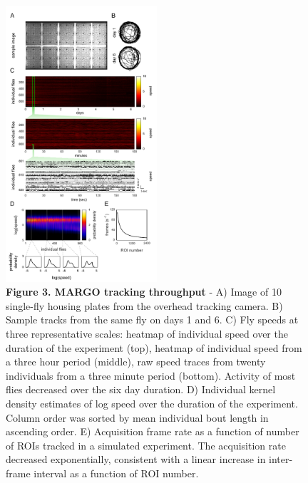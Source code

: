 \documentclass[10pt]{article}
\begin{document}
\clearpage
\begin{figure}[h!]
	\begin{center}
		\includegraphics[width=0.5\textwidth]{../figures/960_fly_imaging_panel_sm.pdf}
	\end{center}
	\caption*{\footnotesize \textbf{Figure 3. MARGO tracking throughput} - A) Image of 10 single-fly housing plates from the overhead tracking camera. B) Sample tracks from the same fly on days 1 and 6. C) Fly speeds at three representative scales: heatmap of individual speed over the duration of the experiment (top), heatmap of individual speed from a three hour period (middle), raw speed traces from twenty individuals from a three minute period (bottom). Activity of most flies decreased over the six day duration. D) Individual kernel density estimates of log speed over the duration of the experiment. Column order was sorted by mean individual bout length in ascending order. E) Acquisition frame rate as a function of number of ROIs tracked in a simulated experiment. The acquisition rate decreased exponentially, consistent with a linear increase in inter-frame interval as a function of ROI number.}
\end{figure}
\end{document}
